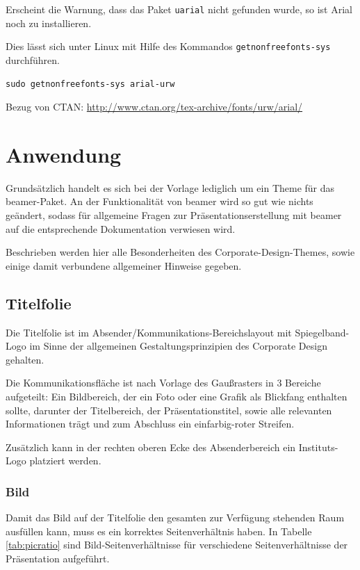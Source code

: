 \documentclass[a4paper,colorscheme=green,TUBStitlepage=picture]{tubsreprt}
\begin{document}
Erscheint die Warnung, dass das Paket \lstinline{uarial} nicht gefunden wurde,
so ist Arial noch zu installieren.

Dies lässt sich unter Linux mit Hilfe des Kommandos
\lstinline{getnonfreefonts-sys} durchführen.

\begin{lstlisting}
sudo getnonfreefonts-sys arial-urw
\end{lstlisting}

Bezug von CTAN: \url{http://www.ctan.org/tex-archive/fonts/urw/arial/}

\chapter{Anwendung}

Grundsätzlich handelt es sich bei der Vorlage lediglich um ein Theme für
das beamer-Paket. An der Funktionalität von beamer wird so gut wie nichts
geändert, sodass für allgemeine Fragen zur Präsentationserstellung mit beamer
auf die entsprechende Dokumentation verwiesen wird. %

Beschrieben werden hier alle Besonderheiten des Corporate-Design-Themes, sowie
einige damit verbundene allgemeiner Hinweise gegeben.



\section{Titelfolie}

Die Titelfolie ist im Absender/Kommunikations-Bereichslayout mit
Spiegelband-Logo im Sinne der allgemeinen Gestaltungsprinzipien des
Corporate Design gehalten.

Die Kommunikationsfläche ist nach Vorlage des Gaußrasters %
in 3 Bereiche aufgeteilt:
Ein Bildbereich, der ein Foto oder eine Grafik als Blickfang enthalten
sollte,
darunter der Titelbereich, der Präsentationstitel, sowie alle relevanten
Informationen trägt
und zum Abschluss ein einfarbig-roter Streifen.

Zusätzlich kann in der rechten oberen Ecke des Absenderbereich ein
Instituts-Logo platziert werden.

\subsection{Bild}

Damit das Bild auf der Titelfolie den gesamten zur Verfügung stehenden Raum
ausfüllen kann, muss es ein korrektes Seitenverhältnis haben.
In Tabelle \ref{tab:picratio} sind Bild-Seitenverhältnisse für verschiedene
Seitenverhältnisse der Präsentation aufgeführt.
\end{document}

